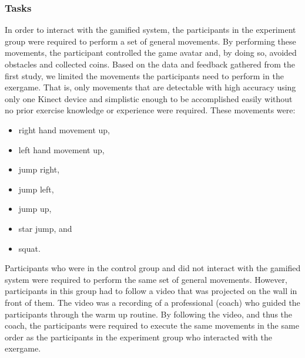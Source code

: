 \subsubsection{Tasks}
In order to interact with the gamified system, the participants in the experiment group were required to perform a set of general movements. By performing these movements, the participant controlled the game avatar and, by doing so, avoided obstacles and collected coins. Based on the data and feedback gathered from the first study, we limited the movements the participants need to perform in the exergame. That is, only movements that are detectable with high accuracy using only one Kinect device and simplistic enough to be accomplished easily without no prior exercise knowledge or experience were required. These movements were: 
\begin{itemize}
\item right hand movement up,
\item left hand movement up,
\item jump right,
\item jump left,
\item jump up, 
\item star jump, and
\item squat.
\end{itemize}
Participants who were in the control group and did not interact with the gamified system were required to perform the same set of general movements. However, participants in this group had to follow a video that was projected on the wall in front of them. The video was a recording of a professional (coach) who guided the participants through the warm up routine. By following the video, and thus the coach, the participants were required to execute the same movements in the same order as the participants in the experiment group who interacted with the exergame.

